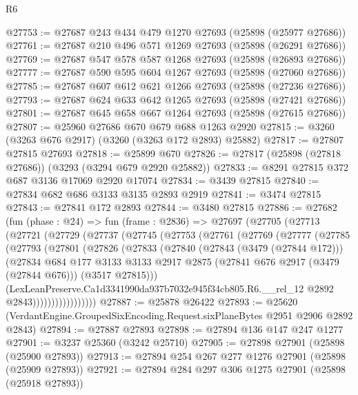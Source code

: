 \begin{lexlean}{R6}
\begin{coremodule}
@27753 := @27687 @243 @434 @479 @1270 @27693 (@25898 (@25977 @27686))
@27761 := @27687 @210 @496 @571 @1269 @27693 (@25898 (@26291 @27686))
@27769 := @27687 @547 @578 @587 @1268 @27693 (@25898 (@26893 @27686))
@27777 := @27687 @590 @595 @604 @1267 @27693 (@25898 (@27060 @27686))
@27785 := @27687 @607 @612 @621 @1266 @27693 (@25898 (@27236 @27686))
@27793 := @27687 @624 @633 @642 @1265 @27693 (@25898 (@27421 @27686))
@27801 := @27687 @645 @658 @667 @1264 @27693 (@25898 (@27615 @27686))
@27807 := @25960 @27686 @670 @679 @688 @1263 @2920
@27815 := @3260 (@3263 @676 @2917) (@3260 (@3263 @172 @2893) @25882)
@27817 := @27807 @27815 @27693
@27818 := @25899 @670
@27826 := @27817 (@25898 (@27818 @27686)) (@3293 (@3294 @679 @2920 @25882))
@27833 := @8291 @27815 @372 @687 @3136 @17069 @2920 @17074
@27834 := @3439 @27815
@27840 := @27834 @682 @686 @3133 @3135 @2893 @2919
@27841 := @3474 @27815
@27843 := @27841 @172 @2893
@27844 := @3480 @27815
@27886 := @27682
    (fun (phase : @24) =>
    fun (frame : @2836) =>
    @27697
      (@27705
        (@27713
          (@27721
            (@27729
              (@27737
                (@27745
                  (@27753
                    (@27761
                      (@27769
                        (@27777
                          (@27785
                            (@27793
                              (@27801
                                (@27826
                                  (@27833
                                    (@27840
                                      (@27843 (@3479 (@27844 @172)))
                                      (@27834
                                        @684
                                        @177
                                        @3133
                                        @3133
                                        @2917
                                        @2875
                                        (@27841 @676 @2917 (@3479 (@27844 @676)))
                                        (@3517 @27815)))
                                    (LexLeanPreserve.Ca1d3341990da937b7032e945f34cb805.R6.__rel_12
                                      @2892
                                      @2843)))))))))))))))))
@27887 := @25878 @26422
@27893 := @25620 (VerdantEngine.GroupedSixEncoding.Request.sixPlaneBytes @2951 @2906 @2892 @2843)
@27894 := @27887 @27893
@27898 := @27894 @136 @147 @247 @1277
@27901 := @3237 @25360 (@3242 @25710)
@27905 := @27898 @27901 (@25898 (@25900 @27893))
@27913 := @27894 @254 @267 @277 @1276 @27901 (@25898 (@25909 @27893))
@27921 := @27894 @284 @297 @306 @1275 @27901 (@25898 (@25918 @27893))

\end{coremodule}
\end{lexlean}
